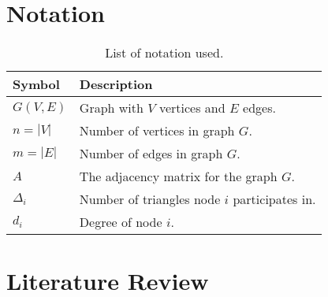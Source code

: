 \documentclass[12pt]{article}
\begin{document}
\section{Notation}

\begin{table}[ht]
    \centering
    \begin{tabular}{ll}
        \toprule
        \textbf{Symbol} & \textbf{Description} \\
        \midrule
        $G(V, E)$       & Graph with $V$ vertices and $E$ edges. \\
        $n = |V|$       & Number of vertices in graph $G$. \\
        $m = |E|$       & Number of edges in graph $G$. \\
        $A$             & The adjacency matrix for the graph $G$. \\
        $\Delta_i$      & Number of triangles node $i$ participates in. \\
        $d_i$           & Degree of node $i$. \\
        \bottomrule
    \end{tabular}
    \caption{List of notation used.}
    \label{tab:notation}
\end{table}

\newpage

\section{Literature Review}
\end{document}
